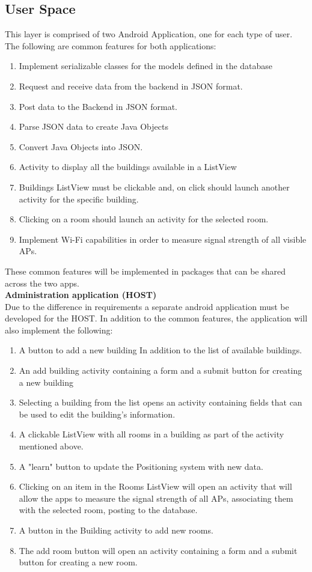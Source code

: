 \subsection{User Space}
This layer is comprised of two Android Application, one for each type of user.
\\
The following are common features for both applications:
\begin{enumerate}
\item Implement serializable classes for the models defined in the database
\item Request and receive data from the backend in JSON format.
\item Post data to the Backend in JSON format.
\item Parse JSON data to create Java Objects
\item Convert Java Objects into JSON.
\item Activity to display all the buildings available in a ListView
\item Buildings ListView must be clickable and, on click should launch another activity for the specific building.
\item Clicking on a room should launch an activity for the selected room.
\item Implement Wi-Fi capabilities in order to measure signal strength of all visible APs.
\end{enumerate}
These common features will be implemented in packages that can be shared across the two apps.
\\
\textbf{Administration application (HOST)}
\\
Due to the difference in requirements a separate android application must be developed for the HOST. In addition to the common features, the application will also implement the following:
\begin{enumerate}
\item A button to add a new building In addition to the list of available buildings.
\item An add building activity containing a form and a submit button for creating a new building
\item Selecting a building from the list opens an activity containing fields that can be used to edit the building’s information.
\item A clickable ListView with all rooms in a building as part of the activity mentioned above.
\item A "learn" button to update the Positioning system with new data.
\item Clicking on an item in the Rooms ListView will open an activity that will allow the apps to measure the signal strength of all APs, associating them with the selected room, posting to the database.
\item A button in the Building activity to add new rooms.
\item The add room button will open an activity containing a form and a submit button for creating a new room.
\end{enumerate}

